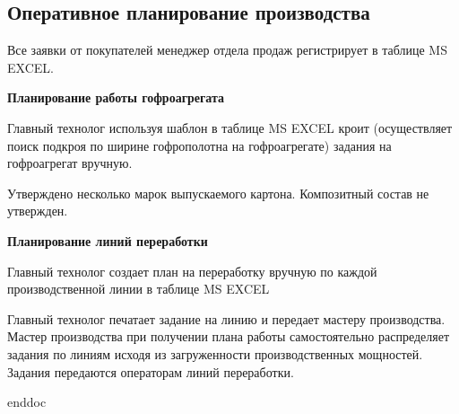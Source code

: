 \subsection{Оперативное планирование производства}
\label{bp:OperPlan}


Все заявки от покупателей менеджер отдела продаж регистрирует в таблице MS EXCEL.




\textbf{Планирование работы гофроагрегата}

Главный технолог используя шаблон в таблице MS EXCEL кроит (осуществляет поиск подкроя по ширине гофрополотна на гофроагрегате)  задания на гофроагрегат вручную. 

Утверждено несколько марок выпускаемого картона. Композитный состав не утвержден.



\textbf{Планирование линий переработки}

Главный технолог создает план на переработку вручную по каждой производственной линии в таблице MS EXCEL %

Главный технолог печатает задание на линию и передает мастеру производства. 
Мастер производства при получении плана работы самостоятельно распределяет задания по линиям исходя из загруженности производственных мощностей.
Задания передаются операторам линий переработки. 



\clearpage

 {enddoc}